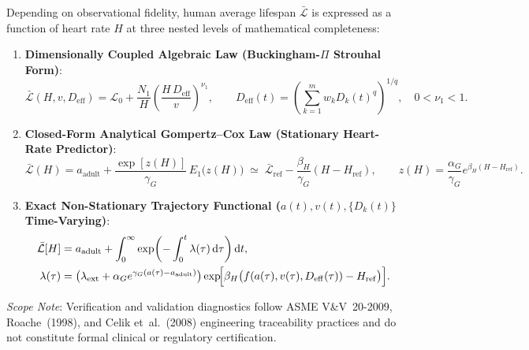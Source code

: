 \documentclass[11pt,a4paper]{article}
\newcommand{\dd}{\mathrm{d}}
\newcommand{\Lbar}{\bar{\mathcal{L}}}
\newcommand{\Deff}{D_{\mathrm{eff}}}
\begin{document}
Depending on observational fidelity, human average lifespan $\Lbar$ is expressed as a function of heart rate $H$ at three nested levels of mathematical completeness:
\begin{enumerate}[leftmargin=1.5em,itemsep=4pt]
  \item \textbf{Dimensionally Coupled Algebraic Law (Buckingham-$\Pi$ Strouhal Form)}:
  \begin{equation}
    \Lbar(H, v, \Deff) = \mathcal{L}_0 + \frac{N_1}{H}\left(\frac{H\,\Deff}{v}\right)^{\nu_1},
    \qquad \Deff(t) = \left(\sum_{k=1}^m w_k D_k(t)^q\right)^{1/q}, \quad 0 < \nu_1 < 1.
  \end{equation}
  \item \textbf{Closed-Form Analytical Gompertz--Cox Law (Stationary Heart-Rate Predictor)}:
  \begin{equation}
    \Lbar(H) = a_{\mathrm{adult}} + \frac{\exp[z(H)]}{\gamma_G}\,E_1\bigl(z(H)\bigr) \;\simeq\; \Lbar_{\mathrm{ref}} - \frac{\beta_H}{\gamma_G}(H - H_{\mathrm{ref}}),
    \qquad z(H) = \frac{\alpha_G}{\gamma_G}e^{\beta_H(H - H_{\mathrm{ref}})}.
  \end{equation}
  \item \textbf{Exact Non-Stationary Trajectory Functional ($a(t), v(t), \{D_k(t)\}$ Time-Varying)}:
  \begin{equation}
  \begin{aligned}
    \Lbar[H] &= a_{\mathrm{adult}} + \int_0^\infty \exp\!\left(-\int_0^t \lambda(\tau)\,\dd\tau\right)\dd t,\\
    \lambda(\tau) &= \bigl(\lambda_{\mathrm{ext}} + \alpha_G e^{\gamma_G(a(\tau)-a_{\mathrm{adult}})}\bigr)\exp\!\Bigl[\beta_H\bigl(f(a(\tau), v(\tau), \Deff(\tau)) - H_{\mathrm{ref}}\bigr)\Bigr].
  \end{aligned}
  \end{equation}
\end{enumerate}

\vspace{0.6em}
\noindent\emph{Scope Note}: Verification and validation diagnostics follow ASME V\&V~20-2009, Roache~(1998), and Celik et~al.~(2008) engineering traceability practices and do not constitute formal clinical or regulatory certification.
\end{document}
